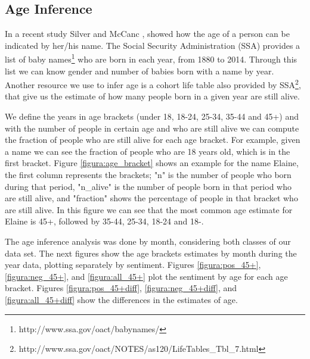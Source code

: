 \documentclass{sig-alternate}
\begin{document}
\subsection{Age Inference}

In a recent study Silver and McCanc \cite{silver2014how}, showed how the age of a person can be indicated by her/his name. The Social Security Administration (SSA) provides a list of baby names\footnote{http://www.ssa.gov/oact/babynames/} who are born in each year, from 1880 to 2014. Through this list we can know gender and number of babies born with a name by year. Another resource we use to infer age is a cohort life table also provided by SSA\footnote{http://www.ssa.gov/oact/NOTES/as120/LifeTables\_Tbl\_7.html}, that give us the estimate of how many people born in a given year are still alive. 

We define the years in age brackets (under 18, 18-24, 25-34, 35-44 and 45+) and with the number of people in certain age and who are still alive we can compute the fraction of people who are still alive for each age bracket. For example, given a name we can see the fraction of people who are 18 years old, which is in the first bracket. Figure \ref{figura:age_bracket} shows an example for the name Elaine, the first column represents the brackets; "n" is the number of people who born during that period, "n\_alive" is the number of people born in that period who are still alive, and "fraction" shows the percentage of people in that bracket who are still alive. In this figure we can see that the most common age estimate for Elaine is 45+, followed by 35-44, 25-34, 18-24 and 18-.



The age inference analysis was done by month, considering both classes of our data set. The next figures show the age brackets estimates by month during the year data, plotting separately by sentiment. Figures \ref{figura:pos_45+}, \ref{figura:neg_45+}, and \ref{figura:all_45+} plot the sentiment by age for each age bracket. Figures \ref{figura:pos_45+diff}, \ref{figura:neg_45+diff}, and \ref{figura:all_45+diff} show the differences in the estimates of age. 


\end{document}
